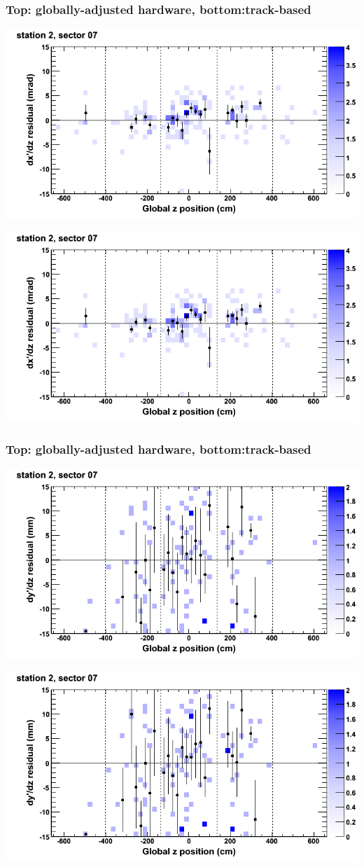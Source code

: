 \documentclass[compress]{beamer}
\begin{document}
\begin{frame}
\frametitle{Top: globally-adjusted hardware, bottom:track-based}
\includegraphics[width=0.7\linewidth]{NOV4_mapplots_HW/DTvsz_st2sec07_dxdz.png}

\includegraphics[width=0.7\linewidth]{NOV4_mapplots/DTvsz_st2sec07_dxdz.png}
\end{frame}

\begin{frame}
\frametitle{Top: globally-adjusted hardware, bottom:track-based}
\includegraphics[width=0.7\linewidth]{NOV4_mapplots_HW/DTvsz_st2sec07_dydz.png}

\includegraphics[width=0.7\linewidth]{NOV4_mapplots/DTvsz_st2sec07_dydz.png}
\end{frame}
\end{document}

